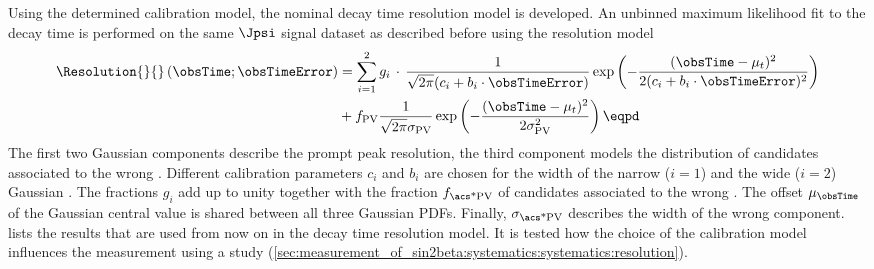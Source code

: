 Using the determined calibration model, the nominal decay time resolution model
is developed. An unbinned maximum likelihood fit to the \Bd decay time is
performed on the same $\Jpsi$ signal \sweighted dataset as described before
using the resolution model
%
\begin{equation}\label{eq:measurement_of_sin2beta:resolution_and_acceptance:resolution}
\begin{split}
  \Resolution{}{}\left(\obsTime;\obsTimeError\right)
  &= \sum_{i=1}^{2}{g_i\,\cdot\,\frac{1}{\sqrt{2\pi}(c_i + b_i \cdot \obsTimeError)}\exp\left(-\frac{(\obsTime - \mu_t)^2}{2(c_i + b_i \cdot \obsTimeError)^2}\right)}\\
  &+ f_{\text{PV}} \frac{1}{\sqrt{2\pi} \sigma_{\text{PV}}} \exp\left(-\frac{(\obsTime - \mu_t)^2}{2 \sigma_{\text{PV}}^2}\right) \eqpd
\end{split}
\end{equation}
%
The first two Gaussian components describe the prompt peak resolution, the third
component models the distribution of candidates associated to the wrong \PV.
Different calibration parameters $c_i$ and $b_i$ are chosen for the width of the
narrow ($i=1$) and the wide ($i=2$) Gaussian \PDF. The fractions $g_i$ add up to
unity together with the fraction $f_\text{\acs*{PV}}$ of candidates associated
to the wrong \PV. The offset $\mu_{\obsTime}$ of the Gaussian central value is
shared between all three Gaussian \acp{PDF}. Finally,
$\sigma_{\text{\acs*{PV}}}$ describes the width of the wrong \PV component.
lists the results that are used from now on in the decay time resolution model.
It is tested how the choice of the calibration model influences the measurement
using a \ToyMC study
(\cref{sec:measurement_of_sin2beta:systematics:systematics:resolution}).
%

